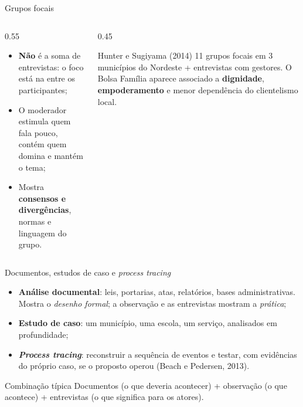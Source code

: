 \begin{frame}{Grupos focais}
  \begin{columns}[T]
    \begin{column}{0.55\textwidth}
      \small
      \begin{itemize}
        \item \textbf{Não} é a soma de entrevistas: o foco está na  entre os participantes;
        \item O moderador estimula quem fala pouco, contém quem domina e mantém o tema;
        \item Mostra \textbf{consensos e divergências}, normas e linguagem do grupo.
      \end{itemize}
    \end{column}
    \begin{column}{0.45\textwidth}
      \begin{block}{Hunter e Sugiyama (2014)}
        \scriptsize
        11 grupos focais em 3 municípios do Nordeste + entrevistas com gestores. O Bolsa Família aparece associado a \textbf{dignidade}, \textbf{empoderamento} e menor dependência do clientelismo local.
      \end{block}
    \end{column}
  \end{columns}
\end{frame}

\begin{frame}{Documentos, estudos de caso e \textit{process tracing}}
  \begin{itemize}
    \item \textbf{Análise documental}: leis, portarias, atas, relatórios, bases administrativas. Mostra o \emph{desenho formal}; a observação e as entrevistas mostram a \emph{prática};
    \item \textbf{Estudo de caso}: um município, uma escola, um serviço, analisados em profundidade;
    \item \textbf{\emph{Process tracing}}: reconstruir a sequência de eventos e testar, com evidências do próprio caso, se o  proposto operou (Beach e Pedersen, 2013).
  \end{itemize}
  \vspace{0.3cm}
  \begin{block}{Combinação típica}
    \small Documentos (o que deveria acontecer) + observação (o que acontece) + entrevistas (o que significa para os atores).
  \end{block}
\end{frame}

